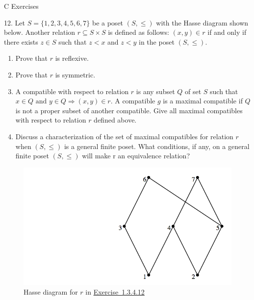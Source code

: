 \documentclass[10pt,]{book}
\theoremstyle{plain}
\theoremstyle{definition}
\theoremstyle{definition}
\theoremstyle{definition}
\theoremstyle{definition}
\begin{document}
\par\smallskip\noindent
\hypertarget{exercisegroup-7}{}\typeout{************************************************}
\typeout{************************************************}
C Exercises%
\begin{exercisegroup}
\item[12.]\hypertarget{exercise-6-3-12}{}Let \(S = \{1,2,3,4,5,6,7\}\) be a poset \((S, \leq )\) with the Hasse diagram shown below. Another relation \(r \subseteq  S\times S\) is defined as follows: \((x, y) \in  r\) if and only if there exists \(z \in S\) such that \(z < x\) and \(z < y\) in the poset \((S, \leq )\).%
\par
\leavevmode%
\begin{enumerate}[label=\alph*]
\item\hypertarget{li-85}{} Prove that \(r\) is reflexive.%
\item\hypertarget{li-86}{} Prove that \(r\) is symmetric.%
\item\hypertarget{li-87}{} A compatible with respect to relation \(r\) is any subset \(Q\) of set \(S\) such that \(x \in  Q \textrm{ and } y \in Q \Rightarrow  (x, y) \in r\). A compatible \(g\) is a maximal compatible if \(Q\) is not a proper subset of another compatible. Give all maximal compatibles with respect to relation \(r\) defined above.%
\item\hypertarget{li-88}{} Discuss a characterization of the set of maximal compatibles for relation \(r\) when \((S, \leq )\) is a general finite poset. What conditions, if any, on a general finite poset \((S, \leq )\) will make r an equivalence relation?%
\end{enumerate}
%
\leavevmode%
\begin{figure}
\centering
\includegraphics[width=1\linewidth]{images/exercise-6-12.png}
\caption{Hasse diagram for \(r\) in \hyperlink{exercise-6-3-12}{Exercise~1.3.4.12}
                \label{fig-exercise-6-12}}
\end{figure}
\par\smallskip
\end{exercisegroup}
\par\smallskip\noindent
\typeout{************************************************}
\typeout{************************************************}
\end{document}
